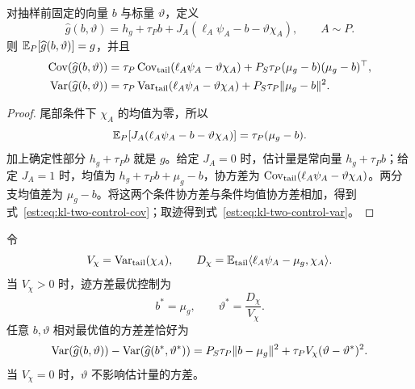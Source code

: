 \begin{theorem}[双控制估计量及其精确协方差]
\label{est:thm:kl-two-controls}
对抽样前固定的向量 $b$ 与标量 $\vartheta$，定义
\begin{equation*}
 \widehat g(b,\vartheta)
 =h_g+\tau_Pb+J_A(\ell_A\psi_A-b-\vartheta \chi_A),\qquad A\sim P.
\end{equation*}
则 $\mathbb E_P[\widehat g(b,\vartheta)]=g$，并且
\begin{align}
 \operatorname{Cov}(\widehat g(b,\vartheta))
 &=\tau_P\operatorname{Cov}_{\mathrm{tail}}(\ell_A\psi_A-\vartheta \chi_A)
   +P_S\tau_P(\mu_g-b)(\mu_g-b)^\top, \label{est:eq:kl-two-control-cov}\\
 \operatorname{Var}(\widehat g(b,\vartheta))
 &=\tau_P\operatorname{Var}_{\mathrm{tail}}(\ell_A\psi_A-\vartheta \chi_A)
   +P_S\tau_P\lVert\mu_g-b\rVert^2. \label{est:eq:kl-two-control-var}
\end{align}
\end{theorem}

\begin{proof}
尾部条件下 $\chi_A$ 的均值为零，所以
\begin{equation*}
 \mathbb E_P[J_A(\ell_A\psi_A-b-\vartheta \chi_A)]
 =\tau_P(\mu_g-b).
\end{equation*}
加上确定性部分 $h_g+\tau_Pb$ 就是 $g$。给定 $J_A=0$ 时，估计量是常向量 $h_g+\tau_Pb$；给定 $J_A=1$ 时，均值为 $h_g+\tau_Pb+\mu_g-b$，协方差为 $\operatorname{Cov}_{\mathrm{tail}}(\ell_A\psi_A-\vartheta \chi_A)$。两分支均值差为 $\mu_g-b$。将这两个条件协方差与条件均值协方差相加，得到式~\eqref{est:eq:kl-two-control-cov}；取迹得到式~\eqref{est:eq:kl-two-control-var}。
\end{proof}

\begin{theorem}[双控制的最优值与精确代价]
令
\begin{equation*}
 V_\chi=\operatorname{Var}_{\mathrm{tail}}(\chi_A),\qquad
 D_\chi=\mathbb E_{\mathrm{tail}}\langle \ell_A\psi_A-\mu_g,\chi_A\rangle.
\end{equation*}
当 $V_\chi>0$ 时，迹方差最优控制为
\begin{equation*}
 b^*=\mu_g,\qquad \vartheta^*=\frac{D_\chi}{V_\chi}.
\end{equation*}
任意 $b,\vartheta$ 相对最优值的方差差恰好为
\begin{equation}
 \operatorname{Var}(\widehat g(b,\vartheta))-\operatorname{Var}(\widehat g(b^*,\vartheta^*))
 =P_S\tau_P\lVert b-\mu_g\rVert^2
  +\tau_PV_\chi(\vartheta-\vartheta^*)^2.
 \label{est:eq:kl-two-control-regret}
\end{equation}
当 $V_\chi=0$ 时，$\vartheta$ 不影响估计量的方差。
\end{theorem}

